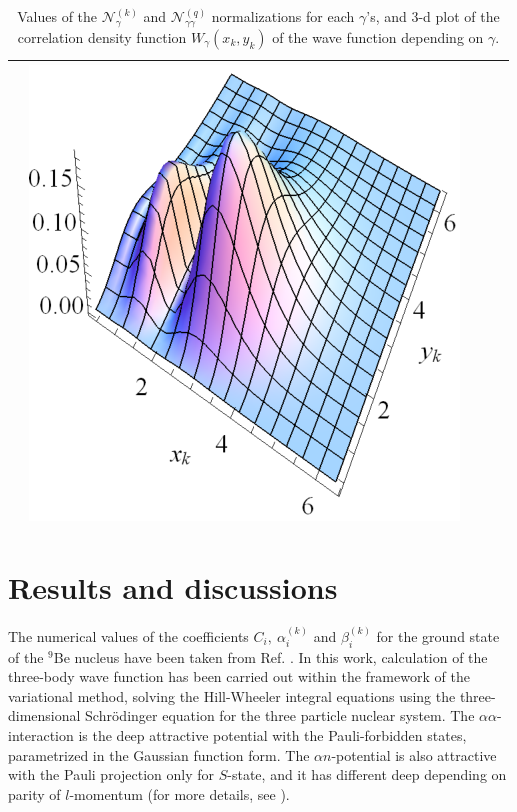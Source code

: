\documentclass[12pt,a4paper,twoside]{article}
\begin{document}
\begin{table}[]
\begin{tabular}{@{}ccccc@{}}
&\includegraphics[scale=0.5]{W1_all}                  
\\ \bottomrule
\end{tabular}
\caption{Values of the $\mathcal{N}_{\gamma}^{(k)}$ and  $\mathcal{N}_{\gamma \gamma}^{(q)}$ normalizations for each $\gamma$'s, and 3-d plot of the correlation density function $W_{\gamma}\left(x_k,y_k\right)$ of the wave function depending on $\gamma$.}
\label{table:atable}
\end{table}






\section*{Results and discussions}

The numerical values of the coefficients $C_i,~\alpha^{(k)}_i$ and $\beta^{(k)}_i$ for the ground state of the $^9$Be nucleus have been taken  from Ref. \cite{voronchev1994analysis}.
In this work, calculation of the three-body wave function has been carried out within the framework of the variational method, solving the Hill-Wheeler integral equations using the three-dimensional Schr\"{o}dinger equation for the three particle nuclear system.
The $\alpha\alpha$-interaction is the deep attractive potential with the Pauli-forbidden states, parametrized in the Gaussian function form. The $\alpha n$-potential is also attractive with the Pauli projection only for  $S$-state, and it has different deep depending on parity of $l$-momentum (for more details, see  \cite{voronchev1995three, voronchev1994analysis}). 
\end{document}
